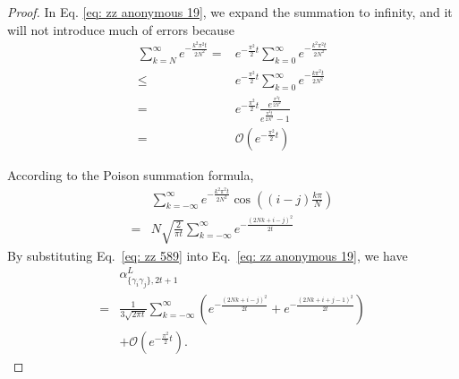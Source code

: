 \documentclass[journal=jctcce,a4paper,manuscript=article]{achemso}
\newcommand{\alpl}{\alpha_{\{\gamma_i\gamma_j\}, 2t+1}^{L}}
\begin{document}
\begin{proof}
  In Eq. \eqref{eq: zz anonymous 19}, we expand the summation to infinity, and it
  will not introduce much of errors because
  \begin{align*}
    \sum_{k=N}^{\infty} e^{-\frac{k^2 \pi^2 t}{2 N^2}} = & e^{-\frac{\pi^2}{2}t}\sum_{k=0}^{\infty} e^{-\frac{k^2 \pi^2 t}{2 N^2}}               \\
    \leq                                                 & e^{-\frac{\pi^2}{2}t}\sum_{k=0}^{\infty} e^{-\frac{k \pi^2 t}{2 N^2}}                 \\
    =                                                    & e^{-\frac{\pi^2}{2}t} \frac{e^{\frac{\pi^2 t}{2 N^2}}}{e^{\frac{\pi^2 t}{2 N^2}} -1 } \\
    =                                                    & \mathcal{O}\left(e^{-\frac{\pi^2}{2}t}\right)
  \end{align*}

  According to the Poison summation formula,
  \begin{equation}
    \begin{aligned}
        & \sum_{k=-\infty}^{\infty} e^{-\frac{k^2 \pi^2 t}{2 N^2}}\cos \left((i-j) \frac{k \pi}{N}\right) \\
      = & N\sqrt{\frac{2}{\pi t}}\sum_{k=-\infty}^{\infty} e^{-\frac{(2Nk+i-j)^2}{2t}}
    \end{aligned}
    \label{eq: zz 589}
  \end{equation}
  By substituting Eq.~\eqref{eq: zz 589} into Eq.~\eqref{eq: zz anonymous 19}, we have
  \begin{align}
      & \alpl                                                                                                                         \\
    = & \frac{1}{3\sqrt{2\pi t}}  \sum_{k=-\infty}^{\infty} \left(e^{-\frac{(2Nk+i-j)^2}{2t}} + e^{-\frac{(2Nk+i+j-1)^2}{2t}} \right) \\
      & +\mathcal{O}\left(e^{-\frac{\pi^2}{2}t}\right).
  \end{align}

\end{proof}
\end{document}
